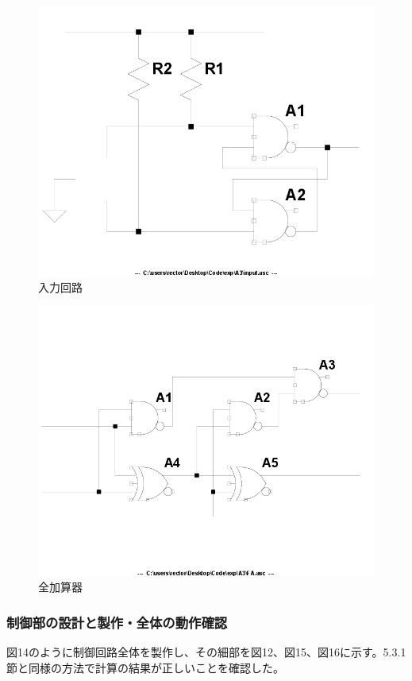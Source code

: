 \documentclass[10pt,a4j,dvipdfmx]{jsarticle}
\begin{document}
\begin{figure}[H]
       \centering
       \includegraphics[width=12cm]{input.png}
       \caption{入力回路}
\end{figure}
\begin{figure}[H]
       \centering
       \includegraphics[width=12cm]{FA.png}
       \caption{全加算器}
\end{figure}

\subsubsection{制御部の設計と製作・全体の動作確認}
図14のように制御回路全体を製作し、その細部を図12、図15、図16に示す。5.3.1節と同様の方法で計算の結果が正しいことを確認した。
\end{document}
